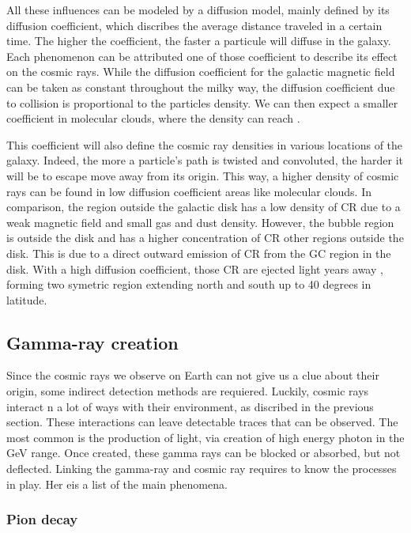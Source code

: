 All these influences can be modeled by a diffusion model, mainly defined by its diffusion coefficient, which discribes the average distance traveled in a certain time. The higher the coefficient, the faster a particule will diffuse in the galaxy. Each phenomenon can be attributed one of those coefficient to describe its effect on the cosmic rays. 
While the diffusion coefficient for the galactic magnetic field can be taken as constant throughout the milky way, the diffusion coefficient due to collision is proportional to the particles density. We can then expect a smaller coefficient in molecular clouds, where the density can reach .

This coefficient will also define the cosmic ray densities in various locations of the galaxy. Indeed, the more a particle's path is twisted and convoluted, the harder it will be to escape move away from its origin. This way, a higher density of cosmic rays can be found in low diffusion coefficient areas like molecular clouds. In comparison, the region outside the galactic disk has a low density of CR due to a weak magnetic field and small gas and dust density. However, the bubble region is outside the disk and has a higher concentration of CR other regions outside the disk. This is due to a direct outward emission of CR from the GC region in the disk. With a high diffusion coefficient, those CR are ejected light years away , forming two symetric region extending north and south up to 40 degrees in latitude.


\subsection{Gamma-ray creation}

Since the cosmic rays we observe on Earth can not give us a clue about their origin, some indirect detection methods are requiered. Luckily, cosmic rays interact n a lot of ways with their environment, as discribed in the previous section. These interactions can leave detectable traces that can be observed. The most common is the production of light, via creation of high energy photon in the GeV range. Once created, these gamma rays can be blocked or absorbed, but not deflected. Linking the gamma-ray and cosmic ray requires to know the processes in play. Her eis a list of the main phenomena.

\subsubsection{Pion decay}

